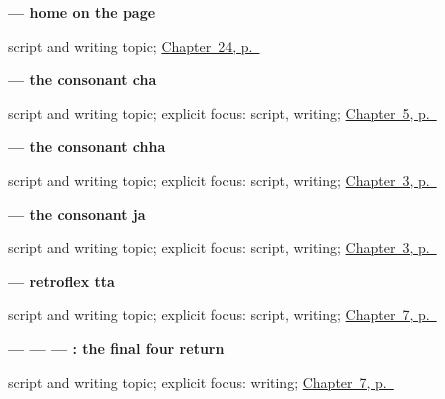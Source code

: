 \noindent\begin{minipage}[t]{\linewidth}
\raggedright
\textbf{ — home on the page}\par
\footnotesize script and writing topic; \hyperref[ch:gu-first-three-places]{Chapter~24, p.~\pageref*{ch:gu-first-three-places}}
\end{minipage}\par\smallskip

\noindent\begin{minipage}[t]{\linewidth}
\raggedright
\textbf{ — the consonant cha}\par
\footnotesize script and writing topic; explicit focus: script, writing; \hyperref[ch:gu-first-use-forms-b]{Chapter~5, p.~\pageref*{ch:gu-first-use-forms-b}}
\end{minipage}\par\smallskip

\noindent\begin{minipage}[t]{\linewidth}
\raggedright
\textbf{ — the consonant chha}\par
\footnotesize script and writing topic; explicit focus: script, writing; \hyperref[ch:gu-doorway-forms]{Chapter~3, p.~\pageref*{ch:gu-doorway-forms}}
\end{minipage}\par\smallskip

\noindent\begin{minipage}[t]{\linewidth}
\raggedright
\textbf{ — the consonant ja}\par
\footnotesize script and writing topic; explicit focus: script, writing; \hyperref[ch:gu-doorway-forms]{Chapter~3, p.~\pageref*{ch:gu-doorway-forms}}
\end{minipage}\par\smallskip

\noindent\begin{minipage}[t]{\linewidth}
\raggedright
\textbf{ — retroflex tta}\par
\footnotesize script and writing topic; explicit focus: script, writing; \hyperref[ch:gu-final-script-closure-b]{Chapter~7, p.~\pageref*{ch:gu-final-script-closure-b}}
\end{minipage}\par\smallskip

\noindent\begin{minipage}[t]{\linewidth}
\raggedright
\textbf{ —  —  — : the final four return}\par
\footnotesize script and writing topic; explicit focus: writing; \hyperref[ch:gu-final-script-closure-b]{Chapter~7, p.~\pageref*{ch:gu-final-script-closure-b}}
\end{minipage}\par\smallskip

